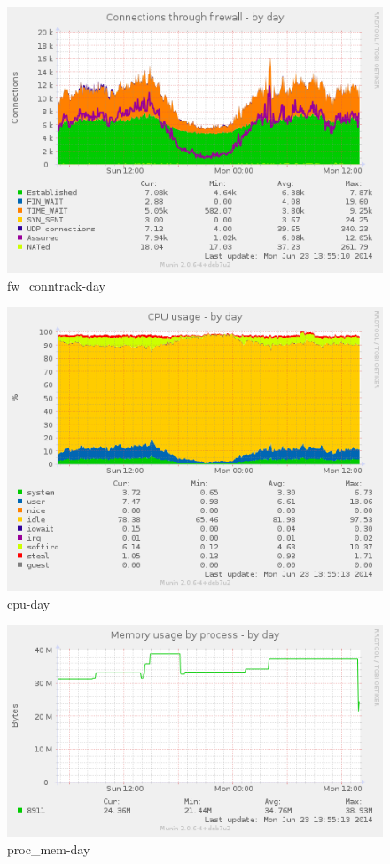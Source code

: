 \documentclass[11pt,a4paper]{sphinxmanual}
\begin{document}
\begin{figure}[H]
\centering
\includegraphics[keepaspectratio,max width=0.95\linewidth]{images/2bf8662e-fadf-11e3-8039-3d59bf689fe2.png}
\caption{fw\_conntrack-day}
\end{figure}

\begin{figure}[H]
\centering
\includegraphics[keepaspectratio,max width=0.95\linewidth]{images/53951d80-fadf-11e3-8e6b-0ceed96950e2.png}
\caption{cpu-day}
\end{figure}

\begin{figure}[H]
\centering
\includegraphics[keepaspectratio,max width=0.95\linewidth]{images/87c98c08-fadf-11e3-9fc9-949f4061d2ca.png}
\caption{proc\_mem-day}
\end{figure}
\end{document}
